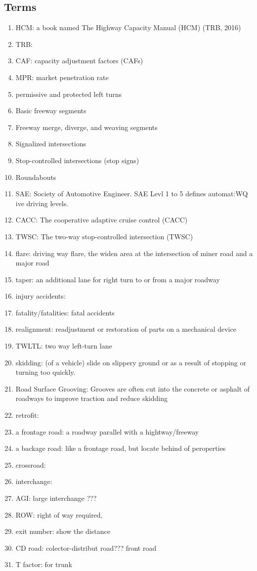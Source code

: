 \documentclass{article}
\begin{document}
  \subsection{Terms}
  \begin{enumerate}
    \item HCM: a book named The Highway Capacity Manual (HCM) (TRB, 2016) 
    \item TRB: 
    \item CAF: capacity adjustment factors (CAFs) 
    \item MPR: market penetration rate
    \item permissive and protected left turns
    \item Basic freeway segments
    \item Freeway merge, diverge, and weaving segments
    \item Signalized intersections
    \item Stop-controlled intersections (stop signs)
    \item Roundabouts
    \item SAE: Society of Automotive Engineer. SAE Levl 1 to 5 defines automat:WQ
    ive driving levels.
    \item CACC: The cooperative adaptive cruise control (CACC)
    \item TWSC: The two-way stop-controlled intersection (TWSC) 
    \item flare: driving way flare, the widen area at the intersection of miner road and a major road
    \item taper: an additional lane for right turn to or from a major roadway
    \item injury accidents: 
    \item fatality/fatalities: fatal accidents
    \item realignment: readjustment or restoration of parts on a mechanical device 
    \item TWLTL: two way left-turn lane
    \item skidding: (of a vehicle) slide on slippery ground or as a result of stopping or turning too quickly.
    \item Road Surface Grooving: Grooves are often cut into the concrete or asphalt of roadways to improve traction and reduce skidding
    \item retrofit: 
    \item a frontage road: a roadway parallel with a hightway/freeway
    \item a backage road: like a frontage road, but locate behind of peroperties
    \item crossroad:
    \item interchange:
    \item AGI: large interchange ???
    \item ROW: right of way required, 
    \item exit number: show the distance  
    \item CD road: colector-distribut road??? front road 
    \item T factor: for trunk 
  \end{enumerate}
\end{document}
